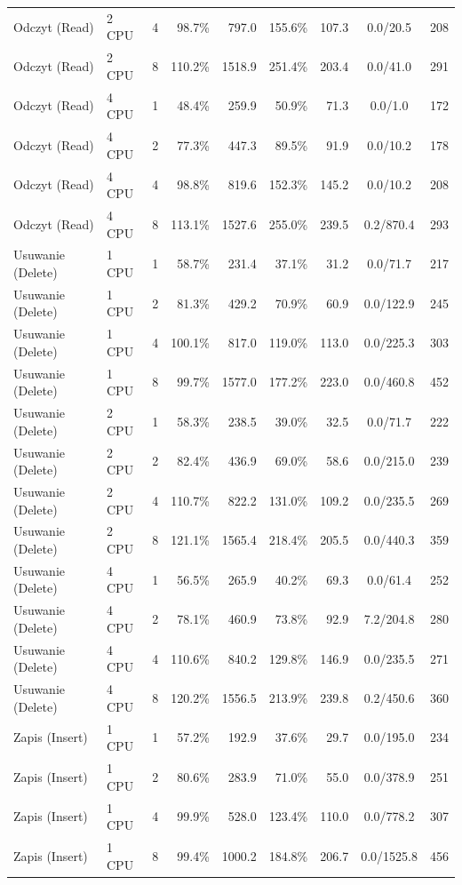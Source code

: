 \begin{table}[ht]
{\begin{tabular}{llcrrrrcc}
Odczyt (Read) & 2 CPU & 4 & 98.7\% & 797.0 & 155.6\% & 107.3 & 0.0/20.5 & 208 \\
Odczyt (Read) & 2 CPU & 8 & 110.2\% & 1518.9 & 251.4\% & 203.4 & 0.0/41.0 & 291 \\
Odczyt (Read) & 4 CPU & 1 & 48.4\% & 259.9 & 50.9\% & 71.3 & 0.0/1.0 & 172 \\
Odczyt (Read) & 4 CPU & 2 & 77.3\% & 447.3 & 89.5\% & 91.9 & 0.0/10.2 & 178 \\
Odczyt (Read) & 4 CPU & 4 & 98.8\% & 819.6 & 152.3\% & 145.2 & 0.0/10.2 & 208 \\
Odczyt (Read) & 4 CPU & 8 & 113.1\% & 1527.6 & 255.0\% & 239.5 & 0.2/870.4 & 293 \\
Usuwanie (Delete) & 1 CPU & 1 & 58.7\% & 231.4 & 37.1\% & 31.2 & 0.0/71.7 & 217 \\
Usuwanie (Delete) & 1 CPU & 2 & 81.3\% & 429.2 & 70.9\% & 60.9 & 0.0/122.9 & 245 \\
Usuwanie (Delete) & 1 CPU & 4 & 100.1\% & 817.0 & 119.0\% & 113.0 & 0.0/225.3 & 303 \\
Usuwanie (Delete) & 1 CPU & 8 & 99.7\% & 1577.0 & 177.2\% & 223.0 & 0.0/460.8 & 452 \\
Usuwanie (Delete) & 2 CPU & 1 & 58.3\% & 238.5 & 39.0\% & 32.5 & 0.0/71.7 & 222 \\
Usuwanie (Delete) & 2 CPU & 2 & 82.4\% & 436.9 & 69.0\% & 58.6 & 0.0/215.0 & 239 \\
Usuwanie (Delete) & 2 CPU & 4 & 110.7\% & 822.2 & 131.0\% & 109.2 & 0.0/235.5 & 269 \\
Usuwanie (Delete) & 2 CPU & 8 & 121.1\% & 1565.4 & 218.4\% & 205.5 & 0.0/440.3 & 359 \\
Usuwanie (Delete) & 4 CPU & 1 & 56.5\% & 265.9 & 40.2\% & 69.3 & 0.0/61.4 & 252 \\
Usuwanie (Delete) & 4 CPU & 2 & 78.1\% & 460.9 & 73.8\% & 92.9 & 7.2/204.8 & 280 \\
Usuwanie (Delete) & 4 CPU & 4 & 110.6\% & 840.2 & 129.8\% & 146.9 & 0.0/235.5 & 271 \\
Usuwanie (Delete) & 4 CPU & 8 & 120.2\% & 1556.5 & 213.9\% & 239.8 & 0.2/450.6 & 360 \\
Zapis (Insert) & 1 CPU & 1 & 57.2\% & 192.9 & 37.6\% & 29.7 & 0.0/195.0 & 234 \\
Zapis (Insert) & 1 CPU & 2 & 80.6\% & 283.9 & 71.0\% & 55.0 & 0.0/378.9 & 251 \\
Zapis (Insert) & 1 CPU & 4 & 99.9\% & 528.0 & 123.4\% & 110.0 & 0.0/778.2 & 307 \\
Zapis (Insert) & 1 CPU & 8 & 99.4\% & 1000.2 & 184.8\% & 206.7 & 0.0/1525.8 & 456 \\

\end{tabular}}
\end{table}
